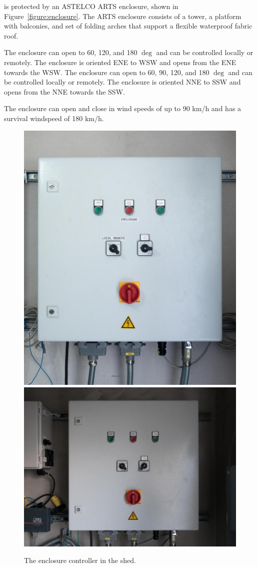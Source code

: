 {\projectname} is protected by an ASTELCO ARTS enclosure, shown in Figure~\ref{figure:enclosure}. The ARTS enclosure consists of a tower, a platform with balconies, and set of folding arches that support a flexible waterproof fabric roof. 


\ifcoatli
The enclosure can open to 60, 120, and 180 $\deg$ and can be controlled locally or remotely. The enclosure is oriented ENE to WSW and opens from the ENE towards the WSW.
\fi
\ifddoti
The enclosure can open to 60, 90, 120, and 180 $\deg$ and can be controlled locally or remotely. The enclosure is oriented NNE to SSW and opens from the NNE towards the SSW.
\fi


The enclosure can open and close in wind speeds of up to 90 km/h and has a survival windspeed of 180 km/h.

\begin{figure}
\begin{center}
\ifcoatli
\includegraphics[width=0.6\linewidth]{figures/enclosure-coatli-controller.jpg}
\fi
\ifddoti
\includegraphics[width=0.6\linewidth]{figures/enclosure-ddoti-controller.jpg}
\fi
\end{center}
\caption{The enclosure controller in the shed.}
\label{figure:enclosure-controller}
\end{figure}

